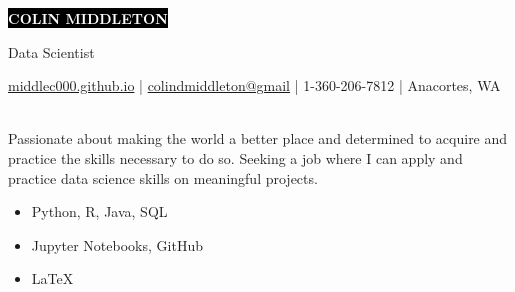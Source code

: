 \documentclass[11pt]{developercv} %
\begin{document}
\setlength{\abovedisplayskip}{0pt}
\setlength{\belowdisplayskip}{0pt}

\colorbox{black}{{\HUGE\textcolor{white}{\textbf{\MakeUppercase{Colin Middleton}}}}}

\vspace{6pt}

{\huge Data Scientist} %

\vspace{0.25cm}

\begin{center}
	\href{https://middlec000.github.io/}{middlec000.github.io}
	\hspace{0.25cm} | \hspace{0.25cm}
	\href{mailto:colindmiddleton@gmail.com}{colindmiddleton@gmail}
	\hspace{0.25cm} | \hspace{0.25cm}
	1-360-206-7812
	\hspace{0.25cm} | \hspace{0.25cm}
	Anacortes, WA
\end{center}

\vspace{0.25cm}


\begin{minipage}[t]{0.5\textwidth} %
	 \\
	Passionate about making the world a better place and determined to acquire and practice the skills necessary to do so. Seeking a job where I can apply and practice data science skills on meaningful projects. 
\end{minipage}
\hfill %
\begin{minipage}[t]{0.4\textwidth}
	\begin{itemize}
		\item Python, R, Java, SQL
		\item Jupyter Notebooks, GitHub
	   	\item LaTeX
	\end{itemize}
\end{minipage}
\end{document}

